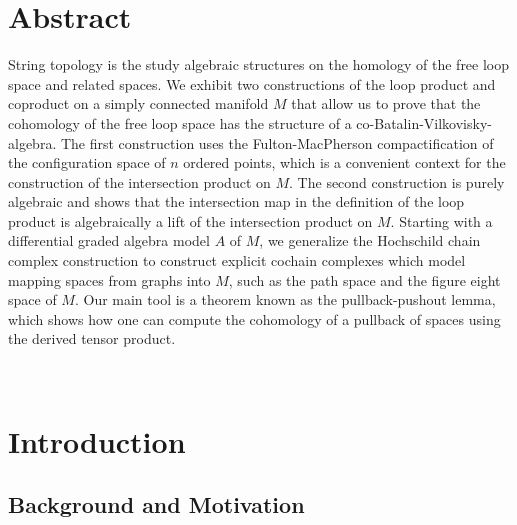 \documentclass{scrartcl}
\theoremstyle{plain}
\theoremstyle{definition}
\begin{document}
\pagestyle{plain}
\makeTitel

\newpage




\section*{Abstract}
String topology is the study algebraic structures on the homology of the free loop space and related spaces. We exhibit two constructions of the loop product and coproduct on a simply connected manifold $M$ that allow us to prove that the cohomology of the free loop space has the structure of a co-Batalin-Vilkovisky-algebra. The first construction uses the Fulton-MacPherson compactification of the configuration space of $n$ ordered points, which is a convenient context for the construction of the intersection product on $M$. The second construction is purely algebraic and shows that the intersection map in the definition of the loop product is algebraically a lift of the intersection product on $M$. Starting with a differential graded algebra model $A$ of $M$, we generalize the Hochschild chain complex construction to construct explicit cochain complexes which model mapping spaces from graphs into $M$, such as the path space and the figure eight space of $M$. Our main tool is a theorem known as the pullback-pushout lemma, which shows how one can compute the cohomology of a pullback of spaces using the derived tensor product. 

\restoregeometry

\newpage




\tableofcontents

\newpage~
\cleardoublepage



\newpage


\section{Introduction}

\subsection{Background and Motivation}
\end{document}
